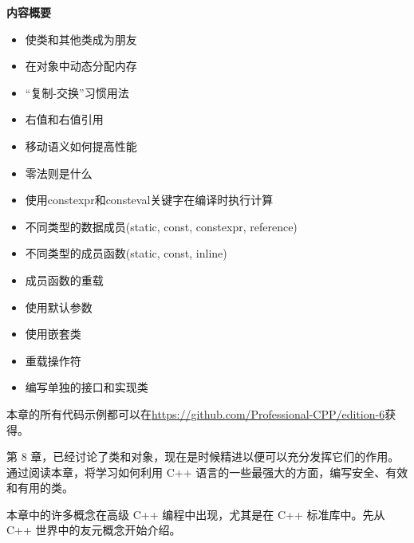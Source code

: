 \noindent
\textbf{内容概要}

\begin{itemize}
\item
使类和其他类成为朋友

\item
在对象中动态分配内存

\item
“复制-交换”习惯用法

\item
右值和右值引用

\item
移动语义如何提高性能

\item
零法则是什么

\item
使用constexpr和consteval关键字在编译时执行计算

\item
不同类型的数据成员(static, const, constexpr, reference)

\item
不同类型的成员函数(static, const, inline)

\item
成员函数的重载

\item
使用默认参数

\item
使用嵌套类

\item
重载操作符

\item
编写单独的接口和实现类
\end{itemize}

本章的所有代码示例都可以在\url{https://github.com/Professional-CPP/edition-6}获得。

第 8 章，已经讨论了类和对象，现在是时候精进以便可以充分发挥它们的作用。通过阅读本章，将学习如何利用 C++ 语言的一些最强大的方面，编写安全、有效和有用的类。

本章中的许多概念在高级 C++ 编程中出现，尤其是在 C++ 标准库中。先从 C++ 世界中的友元概念开始介绍。














